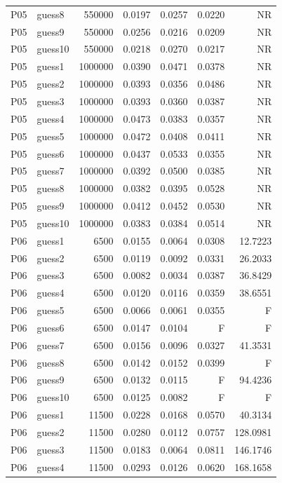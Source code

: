 {\begin{longtable}{llrrrrr}
P05 & guess8 & 550000 & 0.0197 & 0.0257 & 0.0220 & NR \\
P05 & guess9 & 550000 & 0.0256 & 0.0216 & 0.0209 & NR \\
P05 & guess10 & 550000 & 0.0218 & 0.0270 & 0.0217 & NR \\
P05 & guess1 & 1000000 & 0.0390 & 0.0471 & 0.0378 & NR \\
P05 & guess2 & 1000000 & 0.0393 & 0.0356 & 0.0486 & NR \\
P05 & guess3 & 1000000 & 0.0393 & 0.0360 & 0.0387 & NR \\
P05 & guess4 & 1000000 & 0.0473 & 0.0383 & 0.0357 & NR \\
P05 & guess5 & 1000000 & 0.0472 & 0.0408 & 0.0411 & NR \\
P05 & guess6 & 1000000 & 0.0437 & 0.0533 & 0.0355 & NR \\
P05 & guess7 & 1000000 & 0.0392 & 0.0500 & 0.0385 & NR \\
P05 & guess8 & 1000000 & 0.0382 & 0.0395 & 0.0528 & NR \\
P05 & guess9 & 1000000 & 0.0412 & 0.0452 & 0.0530 & NR \\
P05 & guess10 & 1000000 & 0.0383 & 0.0384 & 0.0514 & NR \\
P06 & guess1 & 6500 & 0.0155 & 0.0064 & 0.0308 & 12.7223 \\
P06 & guess2 & 6500 & 0.0119 & 0.0092 & 0.0331 & 26.2033 \\
P06 & guess3 & 6500 & 0.0082 & 0.0034 & 0.0387 & 36.8429 \\
P06 & guess4 & 6500 & 0.0120 & 0.0116 & 0.0359 & 38.6551 \\
P06 & guess5 & 6500 & 0.0066 & 0.0061 & 0.0355 & F \\
P06 & guess6 & 6500 & 0.0147 & 0.0104 & F & F \\
P06 & guess7 & 6500 & 0.0156 & 0.0096 & 0.0327 & 41.3531 \\
P06 & guess8 & 6500 & 0.0142 & 0.0152 & 0.0399 & F \\
P06 & guess9 & 6500 & 0.0132 & 0.0115 & F & 94.4236 \\
P06 & guess10 & 6500 & 0.0125 & 0.0082 & F & F \\
P06 & guess1 & 11500 & 0.0228 & 0.0168 & 0.0570 & 40.3134 \\
P06 & guess2 & 11500 & 0.0280 & 0.0112 & 0.0757 & 128.0981 \\
P06 & guess3 & 11500 & 0.0183 & 0.0064 & 0.0811 & 146.1746 \\
P06 & guess4 & 11500 & 0.0293 & 0.0126 & 0.0620 & 168.1658 \\

\end{longtable}}
